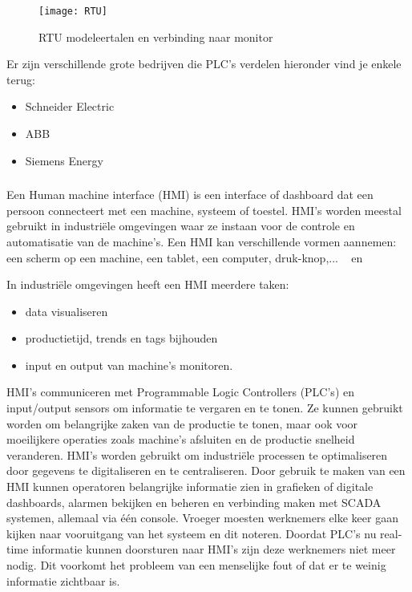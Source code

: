 \begin{figure}
    \texttt{[image: RTU]}
    \caption{RTU modeleertalen en verbinding naar monitor\autocite{Realpars2018} \label{fig:2.6}} 
\end{figure}

Er zijn verschillende grote bedrijven die PLC's verdelen hieronder vind je enkele terug:
\begin{itemize}
    \item Schneider Electric
    \item ABB
    \item Siemens Energy
\end{itemize}

\subsubsection{}
\label{subsubsec:HMI}
Een Human machine interface (HMI) is een interface of dashboard dat een persoon connecteert met een machine, systeem of toestel. HMI's worden meestal gebruikt in industriële omgevingen waar ze instaan voor de controle en automatisatie van de machine's. Een HMI kan verschillende vormen aannemen: een scherm op een machine, een tablet, een computer, druk-knop,... ~\autocite{Exor2019} en~\autocite{2018}

In industriële omgevingen heeft een HMI meerdere taken:
\begin{itemize}
    \item data visualiseren
    \item productietijd, trends en tags bijhouden
    \item input en output van machine's monitoren.
\end{itemize}

HMI's communiceren met Programmable Logic Controllers (PLC's) en input/output sensors om informatie te vergaren en te tonen. Ze kunnen gebruikt worden om belangrijke zaken van de productie te tonen, maar ook voor moeilijkere operaties zoals machine's afsluiten en de productie snelheid veranderen. HMI's worden gebruikt om industriële processen te optimaliseren door gegevens te digitaliseren en te centraliseren. Door gebruik te maken van een HMI kunnen operatoren belangrijke informatie zien in grafieken of digitale dashboards, alarmen bekijken en beheren en verbinding maken met SCADA systemen, allemaal via één console. Vroeger moesten werknemers elke keer gaan kijken naar vooruitgang van het systeem en dit noteren. Doordat PLC's nu real-time informatie kunnen doorsturen naar HMI's zijn deze werknemers niet meer nodig. Dit voorkomt het probleem van een menselijke fout of dat er te weinig informatie zichtbaar is.~\autocite{2018}


